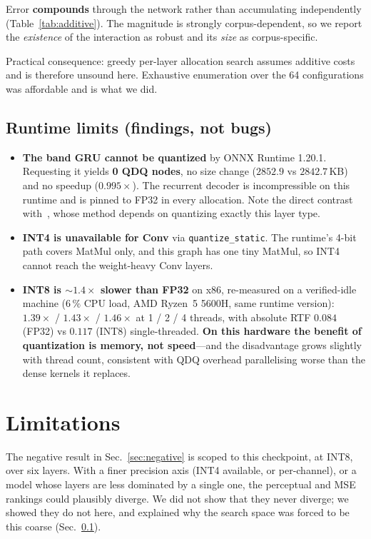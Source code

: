 \documentclass[conference]{IEEEtran}
\begin{document}
Error \textbf{compounds} through the network rather than accumulating independently
(Table~\ref{tab:additive}). The magnitude is strongly corpus-dependent, so we report the
\emph{existence} of the interaction as robust and its \emph{size} as corpus-specific.

Practical consequence: greedy per-layer allocation search assumes additive costs and is therefore
unsound here. Exhaustive enumeration over the 64 configurations was affordable and is what we did.

\subsection{Runtime limits (findings, not bugs)}
\label{sec:runtime}

\begin{itemize}
\item \textbf{The band GRU cannot be quantized} by ONNX Runtime 1.20.1. Requesting it yields
\textbf{0 QDQ nodes}, no size change ($2852.9$ vs $2842.7$\,KB) and no speedup ($0.995\times$). The
recurrent decoder is incompressible on this runtime and is pinned to FP32 in every allocation. Note
the direct contrast with~\cite{rusci2022}, whose method depends on quantizing exactly this layer
type.
\item \textbf{INT4 is unavailable for Conv} via \texttt{quantize\_static}. The runtime's 4-bit path
covers MatMul only, and this graph has one tiny MatMul, so INT4 cannot reach the weight-heavy Conv
layers.
\item \textbf{INT8 is ${\sim}1.4\times$ slower than FP32} on x86, re-measured on a verified-idle
machine ($6\,\%$ CPU load, AMD Ryzen~5 5600H, same runtime version): $1.39\times$ / $1.43\times$ /
$1.46\times$ at 1 / 2 / 4 threads, with absolute RTF $0.084$ (FP32) vs $0.117$ (INT8)
single-threaded. \textbf{On this hardware the benefit of quantization is memory, not speed}---and
the disadvantage grows slightly with thread count, consistent with QDQ overhead parallelising worse
than the dense kernels it replaces.
\end{itemize}

\section{Limitations}

The negative result in Sec.~\ref{sec:negative} is scoped to this checkpoint, at INT8, over six
layers. With a finer precision axis (INT4 available, or per-channel), or a model whose layers are
less dominated by a single one, the perceptual and MSE rankings could plausibly diverge. We did not
show that they never diverge; we showed they do not here, and explained why the search space was
forced to be this coarse (Sec.~\ref{sec:runtime}).
\end{document}
